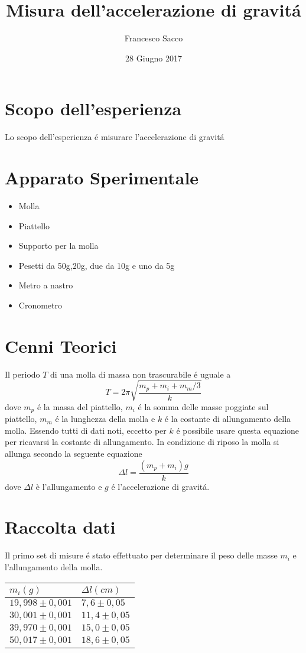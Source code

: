 \documentclass{exam}
\date{28 Giugno 2017}
\title{Misura dell'accelerazione di gravit\'a}
\author{Francesco Sacco}
\begin{document}
	\maketitle
	\section{Scopo dell'esperienza}
		Lo scopo dell'esperienza \'e misurare l'accelerazione di gravit\'a

	\section{Apparato Sperimentale}
		\begin{itemize}
			\item Molla
			\item Piattello
			\item Supporto per la molla
			\item Pesetti da 50g,20g, due da 10g e uno da 5g
			\item Metro a nastro
			\item Cronometro
		\end{itemize}
	\section{Cenni Teorici}
		Il periodo $T$ di una molla di massa non trascurabile \'e uguale a 
		\begin{equation}
			T=2\pi \sqrt{\frac{m_p+m_i+m_m/3}{k}} 
		\end{equation}
		dove $m_p$ \'e la massa del piattello, $m_i$ \'e la somma delle masse poggiate sul piattello, $m_m$ \'e la lunghezza della molla e $k$ \'e la costante di allungamento della molla.\newline
		Essendo tutti di dati noti, eccetto per $k$ \'e possibile usare questa equazione per ricavarsi la costante di allungamento.\newline\newline
		In condizione di riposo la molla si allunga secondo la seguente equazione		
		\begin{equation}
			\Delta l=\frac{(m_p+m_i)g}{k}
		\end{equation}
		dove $\Delta l$ è l'allungamento e $g$ \'e l'accelerazione di gravit\'a.
	\section{Raccolta dati}
		Il primo set di misure \'e stato effettuato per determinare il peso delle masse $m_i$ e l'allungamento della molla.
		\begin{tabular}{ll}
			\toprule
			$m_i(g)$&$\Delta l(cm)$\\
			\midrule
			$19,998\pm0,001$&$7,6\pm0,05$\\
			$30,001\pm0,001$&$11,4\pm0,05$\\
			$39,970\pm0,001$&$15,0\pm0,05$\\
			$50,017\pm0,001$&$18,6\pm0,05$\\
			\bottomrule
		\end{tabular}
\end{document}

